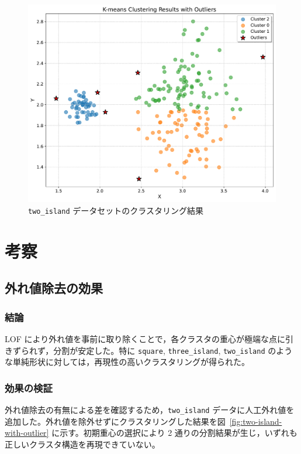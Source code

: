 \documentclass[a4j,dvipdfmx]{jsarticle}
\begin{document}
\begin{figure}[H]
  \centering
  \includegraphics[width=.4\textwidth]{two_island_output_plot.pdf}
  \caption{\texttt{two\_island} データセットのクラスタリング結果}
  \label{fig:two-island}
\end{figure}

\section{考察}
\label{sec:discussion}
\subsection{外れ値除去の効果}
\subsubsection{結論}
LOF により外れ値を事前に取り除くことで，各クラスタの重心が極端な点に引きずられず，分割が安定した。特に \texttt{square}, \texttt{three\_island}, \texttt{two\_island} のような単純形状に対しては，再現性の高いクラスタリングが得られた。

\subsubsection{効果の検証}
外れ値除去の有無による差を確認するため，\texttt{two\_island} データに人工外れ値を追加した。外れ値を除外せずにクラスタリングした結果を図~\ref{fig:two-island-with-outlier} に示す。初期重心の選択により 2 通りの分割結果が生じ，いずれも正しいクラスタ構造を再現できていない。
\end{document}
